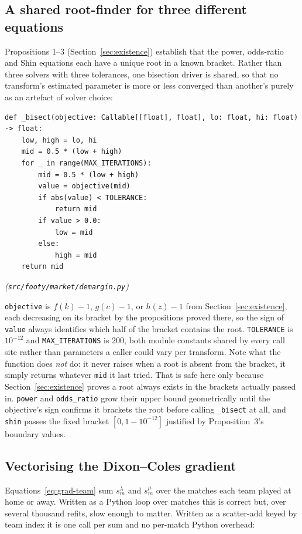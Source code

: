 \documentclass[11pt,a4paper]{article}
\begin{document}
\begin{appendices}
\subsection{A shared root-finder for three different equations}

Propositions 1--3 (Section~\ref{sec:existence}) establish that the power,
odds-ratio and Shin equations each have a unique root in a known bracket.
Rather than three solvers with three tolerances, one bisection driver is
shared, so that no transform's estimated parameter is more or less converged
than another's purely as an artefact of solver choice:

\begin{lstlisting}
def _bisect(objective: Callable[[float], float], lo: float, hi: float) -> float:
    low, high = lo, hi
    mid = 0.5 * (low + high)
    for _ in range(MAX_ITERATIONS):
        mid = 0.5 * (low + high)
        value = objective(mid)
        if abs(value) < TOLERANCE:
            return mid
        if value > 0.0:
            low = mid
        else:
            high = mid
    return mid
\end{lstlisting}
\emph{(\texttt{src/footy/market/demargin.py})}

\texttt{objective} is $f(k) - 1$, $g(c) - 1$, or $h(z) - 1$ from
Section~\ref{sec:existence}, each decreasing on its bracket by the
propositions proved there, so the sign of \texttt{value} always identifies
which half of the bracket contains the root. \texttt{TOLERANCE} is
$10^{-12}$ and \texttt{MAX\_ITERATIONS} is 200, both module constants shared
by every call site rather than parameters a caller could vary per transform.
Note what the function does \emph{not} do: it never raises when a root is
absent from the bracket, it simply returns whatever \texttt{mid} it last
tried. That is safe here only because Section~\ref{sec:existence} proves a
root always exists in the brackets actually passed in. \texttt{power} and
\texttt{odds\_ratio} grow their upper bound geometrically until the
objective's sign confirms it brackets the root before calling
\texttt{\_bisect} at all, and \texttt{shin} passes the fixed bracket
$[0, 1{-}10^{-12}]$ justified by Proposition~3's boundary values.

\subsection{Vectorising the Dixon--Coles gradient}

Equations~\eqref{eq:grad-team} sum $s^\lambda_m$ and $s^\mu_m$ over the
matches each team played at home or away. Written as a Python loop over
matches this is correct but, over several thousand refits, slow enough to
matter. Written as a scatter-add keyed by team index it is one call per
sum and no per-match Python overhead:


\end{appendices}
\end{document}
